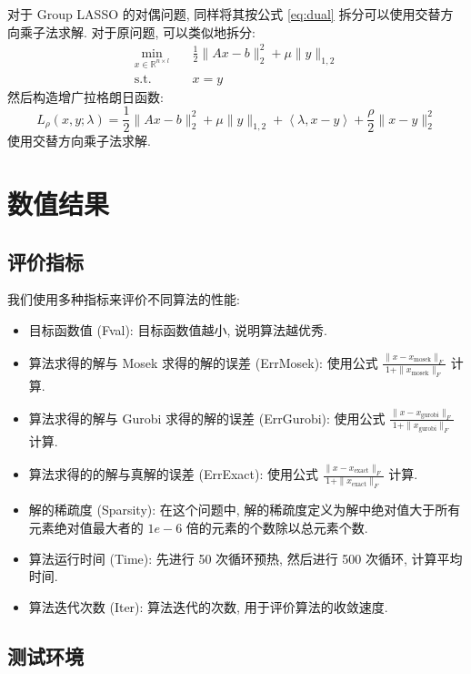 \documentclass{article}
\begin{document}
对于 Group LASSO 的对偶问题, 同样将其按公式 \ref{eq:dual} 拆分可以使用交替方向乘子法求解. 对于原问题, 可以类似地拆分:
\begin{equation*}
    \begin{aligned}
        \min_{x \in \mathbb{R}^{n\times l}}\quad &\frac{1}{2} \|Ax - b\|_2^2 +
        \mu \|y\|_{1,2}\\
        \text{s.t.}\quad & x=y
    \end{aligned}
\end{equation*}
然后构造增广拉格朗日函数:
\begin{equation*}
    L_\rho(x, y; \lambda) = \frac{1}{2} \|Ax - b\|_2^2 + \mu \|y\|_{1,2} + \left<\lambda, x - y\right> + \frac{\rho}{2}\|x - y\|_2^2
\end{equation*}
使用交替方向乘子法求解.

\section{数值结果}

\subsection{评价指标}
我们使用多种指标来评价不同算法的性能:
\begin{itemize}
    \item 目标函数值 (Fval): 目标函数值越小, 说明算法越优秀.
    \item 算法求得的解与 Mosek 求得的解的误差 (ErrMosek): 使用公式 $\frac{\|x - x_{\text{mosek}}\|_F}{1+\|x_{\text{mosek}}\|_F}$ 计算.
    \item 算法求得的解与 Gurobi 求得的解的误差 (ErrGurobi): 使用公式 $\frac{\|x - x_{\text{gurobi}}\|_F}{1+\|x_{\text{gurobi}}\|_F}$ 计算.
    \item 算法求得的的解与真解的误差 (ErrExact): 使用公式 $\frac{\|x - x_{\text{exact}}\|_F}{1+\|x_{\text{exact}}\|_F}$ 计算.
    \item 解的稀疏度 (Sparsity): 在这个问题中, 解的稀疏度定义为解中绝对值大于所有元素绝对值最大者的 $1e-6$ 倍的元素的个数除以总元素个数.
    \item 算法运行时间 (Time): 先进行 50 次循环预热, 然后进行 500 次循环, 计算平均时间.
    \item 算法迭代次数 (Iter): 算法迭代的次数, 用于评价算法的收敛速度.
\end{itemize}

\subsection{测试环境}
\end{document}

